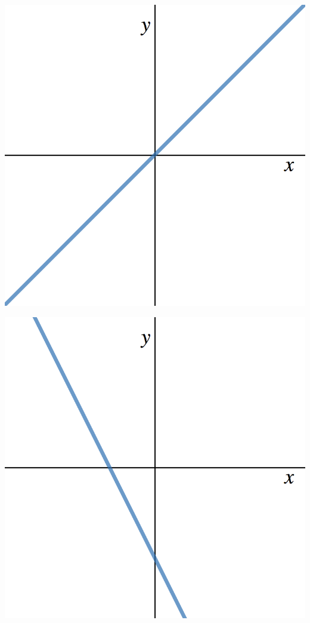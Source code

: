 \documentclass[11pt]{exam}
\theoremstyle{definition}
\begin{document}
\begin{questions}
\begin{enumerate}[(I)]
\begin{minipage}{.35\textwidth}
	\end{minipage}
	\begin{minipage}{.35\textwidth}
	\item \includegraphics[scale=0.1]{Figures/linearII.png}
	\end{minipage}
	\begin{minipage}{.35\textwidth}
	\item \includegraphics[scale=0.1]{Figures/linearIII.png}

\end{minipage}
\end{enumerate}
\end{questions}
\end{document}
